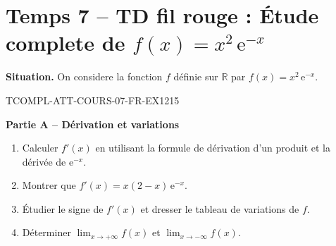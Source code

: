 

\section*{Temps 7 -- TD fil rouge : Étude complete de $f(x) = x^2\,\mathrm{e}^{-x}$}

\textbf{Situation.} On considere la fonction $f$ définie sur $\mathbb{R}$ par $f(x) = x^2\,\mathrm{e}^{-x}$.

\bigskip


\begin{exercice}{TCOMPL-ATT-COURS-07-FR-EX1}{2}{15}

\textbf{Partie A -- Dérivation et variations}

\begin{enumerate}
  \item Calculer $f'(x)$ en utilisant la formule de dérivation d'un produit et la dérivée de $\mathrm{e}^{-x}$.
  \item Montrer que $f'(x) = x(2-x)\,\mathrm{e}^{-x}$.
  \item Étudier le signe de $f'(x)$ et dresser le tableau de variations de $f$.
  \item Déterminer $\lim_{x \to +\infty} f(x)$ et $\lim_{x \to -\infty} f(x)$.
\end{enumerate}

\end{exercice}

